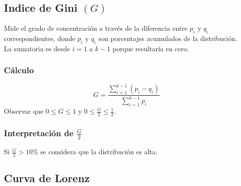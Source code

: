 \subsection{Indice de Gini $(G)$}
Mide el grado de concentración a través de la diferencia entre $p_i$ y $q_i$ correspondientes, donde $p_i$ y $q_i$ son porcentajes acumulados de la distribución.\\${ }$\\La sumatoria es desde $i=1$ a $k-1$ porque resultaría en cero.
\subsubsection{Cálculo}
$$G=\dfrac{\displaystyle\sum_{i=1}^{k-1}(p_i-q_i)}{\displaystyle\sum_{i=1}^{k-1}p_i}$$
Observar que $0\leq G \leq 1$ y $0\leq\frac{G}{2}\leq \frac{1}{2}$.
\subsubsection{Interpretación de $\frac{G}{2}$}
Si $\frac{G}{2}>10\%$ se considera que la distribución es alta.
\subsection{Curva de Lorenz}
\begin{center}
\end{center}
